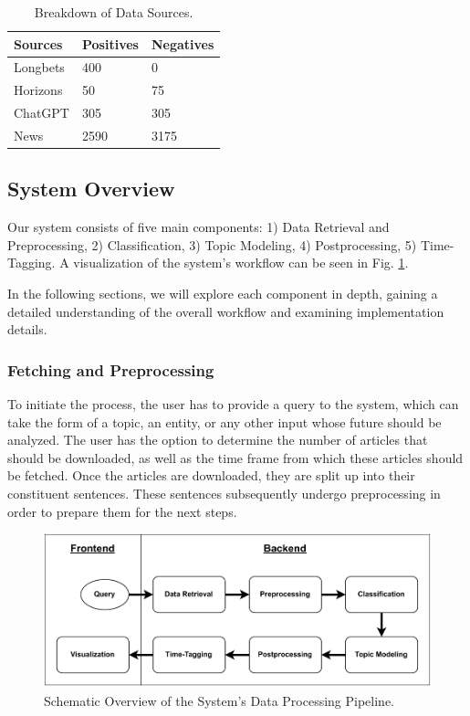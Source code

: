 \documentclass[sigconf]{acmart}
\begin{document}
\begin{table}[H]
  \caption{Breakdown of Data Sources.}
  \label{tab:dataset}
  \begin{tabular}{lll}
    \toprule
    \textbf{Sources} & \textbf{Positives} & \textbf{Negatives} \\
    \midrule
    Longbets\footnotemark[2] & 400 & 0 \\
    Horizons\footnotemark[3] & 50 & 75 \\
    ChatGPT \footnotemark[4] & 305 & 305 \\
    News & 2590 & 3175 \\
  \bottomrule
  \end{tabular}
\end{table}





\subsection{System Overview}
Our system consists of five main components: 1) Data Retrieval and Preprocessing, 2) Classification, 3) Topic Modeling, 4) Postprocessing, 5) Time-Tagging. A visualization of the system's workflow can be seen in Fig.  \ref{fig:archi}.

In the following sections, we will explore each component in depth, gaining a detailed understanding of the overall workflow and examining implementation details.

\subsubsection{Fetching and Preprocessing}
To initiate the process, the user has to provide a query to the system, which can take the form of a topic, an entity, or any other input whose future should be analyzed. The user has the option to determine the number of articles that should be downloaded, as well as the time frame from which these articles should be fetched. Once the articles are downloaded, they are split up into their constituent sentences. These sentences subsequently undergo preprocessing in order to prepare them for the next steps.

\begin{figure}[H]
\centering
\includegraphics[width=\linewidth]{img/system.pdf}
\caption{Schematic Overview of the System's Data Processing Pipeline.}
\label{fig:archi}
\end{figure}
\end{document}
